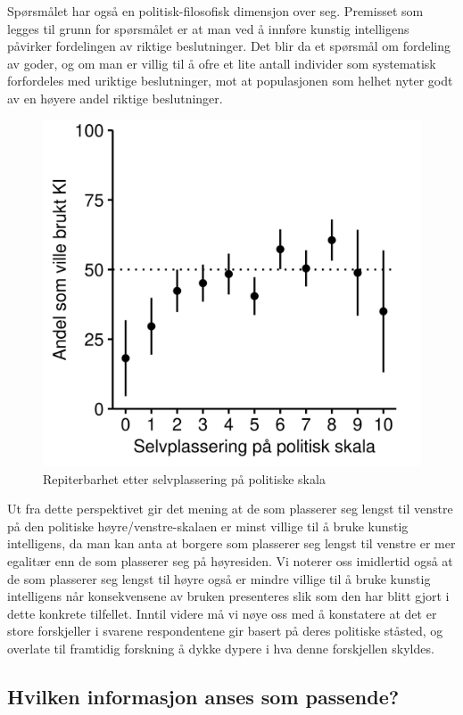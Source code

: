 \documentclass[
  12pt,
  a4paper, 12pt]{article}
\begin{document}
Spørsmålet har også en politisk-filosofisk dimensjon over seg.
Premisset som legges til grunn for spørsmålet er at man ved å innføre kunstig intelligens påvirker fordelingen av riktige beslutninger.
Det blir da et spørsmål om fordeling av goder, og om man er villig til å ofre et lite antall individer som systematisk forfordeles med uriktige beslutninger, mot at populasjonen som helhet nyter godt av en høyere andel riktige beslutninger.

\begin{figure}

{\centering \includegraphics[width=0.6\linewidth]{figs/png/fig_relval_polscale} 

}

\caption{Repiterbarhet etter selvplassering på politiske skala}\label{fig:unnamed-chunk-24}
\end{figure}

Ut fra dette perspektivet gir det mening at de som plasserer seg lengst til venstre på den politiske høyre/venstre-skalaen er minst villige til å bruke kunstig intelligens, da man kan anta at borgere som plasserer seg lengst til venstre er mer egalitær enn de som plasserer seg på høyresiden.
Vi noterer oss imidlertid også at de som plasserer seg lengst til høyre også er mindre villige til å bruke kunstig intelligens når konsekvensene av bruken presenteres slik som den har blitt gjort i dette konkrete tilfellet.
Inntil videre må vi nøye oss med å konstatere at det er store forskjeller i svarene respondentene gir basert på deres politiske ståsted, og overlate til framtidig forskning å dykke dypere i hva denne forskjellen skyldes.

\hypertarget{input}{%
\subsection{Hvilken informasjon anses som passende?}\label{input}}
\end{document}
